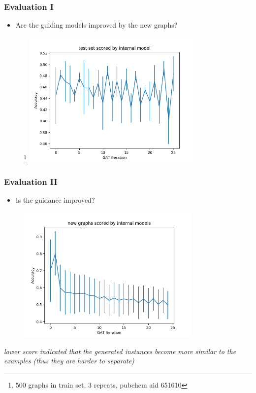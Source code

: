 \documentclass{beamer}
\begin{document}
\begin{frame}
    \frametitle{Evaluation I}
    \begin{itemize}
        \item Are the guiding models improved by the new graphs?
    \end{itemize}

   \begin{figure}[ht]
        \centering
        \footnote{500 graphs in train set, 3 repeats, pubchem aid 651610}
        \includegraphics[width=0.80\textwidth]{images/eval3.png}
    \end{figure}
\end{frame}


\begin{frame}
    \frametitle{Evaluation II}
    \begin{itemize}
        \item Is the guidance improved? 
    \end{itemize}

   \begin{figure}[ht]
        \centering
        \includegraphics[width=0.80\textwidth]{images/eval2.png}
    \end{figure}
   \small{\em lower score indicated that the generated instances become more similar
              to the examples (thus they are harder to separate)}
\end{frame}
\end{document}
